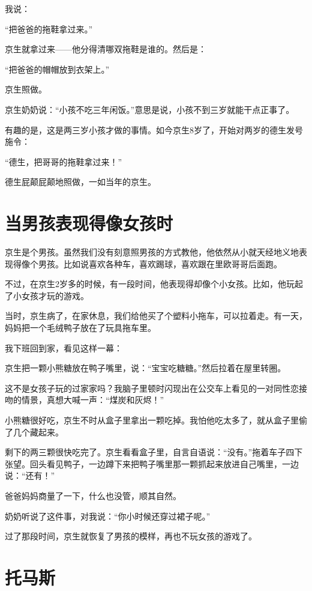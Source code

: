 \documentclass[twoside,openright,headings=optiontohead]{ctexbook} %
\begin{document}
{我说：

``把爸爸的拖鞋拿过来。''

京生就拿过来------他分得清哪双拖鞋是谁的。然后是：

``把爸爸的帽帽放到衣架上。''

京生照做。

京生奶奶说：``小孩不吃三年闲饭。''意思是说，小孩不到三岁就能干点正事了。

有趣的是，这是两三岁小孩才做的事情。如今京生8岁了，开始对两岁的德生发号施令：

``德生，把哥哥的拖鞋拿过来！''

德生屁颠屁颠地照做，一如当年的京生。

\chapter*{当男孩表现得像女孩时}\label{girly}

京生是个男孩。虽然我们没有刻意照男孩的方式教他，他依然从小就天经地义地表现得像个男孩。比如说喜欢各种车，喜欢踢球，喜欢跟在里欧哥哥后面跑。

不过，在京生2岁多的时候，有一段时间，他表现得却像个小女孩。比如，他玩起了小女孩才玩的游戏。

当时，京生病了，在家休息，我们给他买了个塑料小拖车，可以拉着走。有一天，妈妈把一个毛绒鸭子放在了玩具拖车里。

我下班回到家，看见这样一幕：

京生把一颗小熊糖放在鸭子嘴里，说：``宝宝吃糖糖。''然后拉着在屋里转圈。

这不是女孩子玩的过家家吗？我脑子里顿时闪现出在公交车上看见的一对同性恋接吻的情景，真想大喊一声：``煤炭和灰烬！''

小熊糖很好吃，京生不时从盒子里拿出一颗吃掉。我怕他吃太多了，就从盒子里偷了几个藏起来。

剩下的两三颗很快吃完了。京生看看盒子里，自言自语说：``没有。''拖着车子四下张望。回头看见鸭子，一边蹲下来把鸭子嘴里那一颗抓起来放进自己嘴里，一边说：``还有！''

爸爸妈妈商量了一下，什么也没管，顺其自然。

奶奶听说了这件事，对我说：``你小时候还穿过裙子呢。''

过了那段时间，京生就恢复了男孩的模样，再也不玩女孩的游戏了。

\chapter*{托马斯}\label{thomas-and-friends}

}
\end{document}
